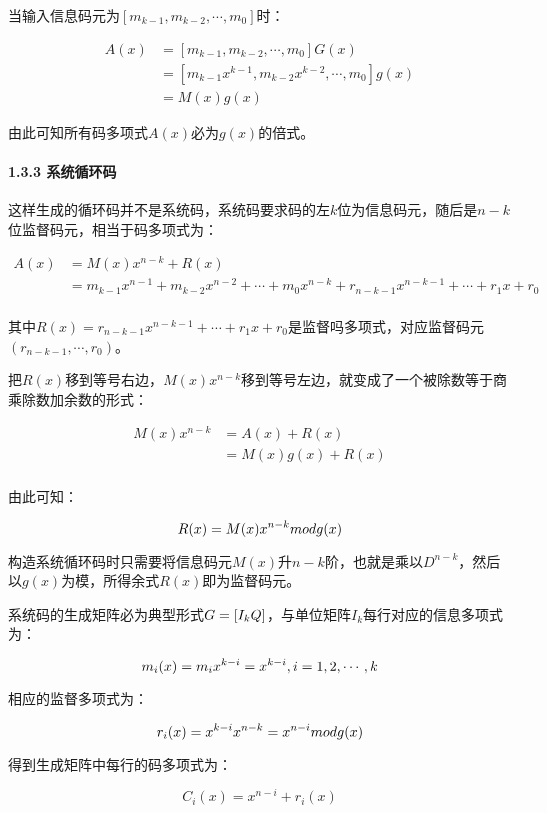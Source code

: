 \documentclass[
]{article}
\begin{document}
当输入信息码元为$[m_{k-1},m_{k-2},\cdots,m_0]$时：

\begin{align}
A(x)&=[m_{k-1},m_{k-2},\cdots,m_0]G(x)\\
    &=[m_{k-1}x^{k-1},m_{k-2}x^{k-2},\cdots,m_0]g(x)\\
    &=M(x)g(x)
\end{align}

由此可知所有码多项式$A(x)$必为$g(x)$的倍式。

\hypertarget{header-n61}{%
\paragraph{1.3.3 系统循环码}\label{header-n61}}

这样生成的循环码并不是系统码，系统码要求码的左$k$位为信息码元，随后是$n-k$位监督码元，相当于码多项式为：

\begin{align}
A(x)&=M(x)x^{n-k}+R(x)\\
    &=m_{k-1}x^{n-1}+m_{k-2}x^{n-2}+\cdots+m_0x^{n-k}+r_{n-k-1}x^{n-k-1}+\cdots+r_1x+r_0\\
\end{align}

其中$R(x)=r_{n-k-1}x^{n-k-1}+\cdots+r_1x+r_0$是监督吗多项式，对应监督码元$(r_{n-k-1},\cdots,r_{0})$。

把$R(x)$移到等号右边，$M(x)x^{n-k}$移到等号左边，就变成了一个被除数等于商乘除数加余数的形式：

\begin{align}
M(x)x^{n-k}&=A(x)+R(x)\\
    	&=M(x)g(x)+R(x)\\
\end{align}

由此可知：

$$R(x)=M(x)x^{n-k} \space mod \space g(x)$$

构造系统循环码时只需要将信息码元$M(x)$升$n-k$阶，也就是乘以$D^{n-k}$，然后以$g(x)$为模，所得余式$R(x)$即为监督码元。

系统码的生成矩阵必为典型形式$G=[I_k \space Q]$，与单位矩阵$I_k$每行对应的信息多项式为：

$$m_i(x)=m_ix^{k-i}=x^{k-i},\space i=1,2,\cdots,k$$

相应的监督多项式为：

$$r_i(x)=x^{k-i}x^{n-k}=x^{n-i}\space mod \space g(x)$$

得到生成矩阵中每行的码多项式为：

$$C_i(x)=x^{n-i}+r_i(x)$$
\end{document}
